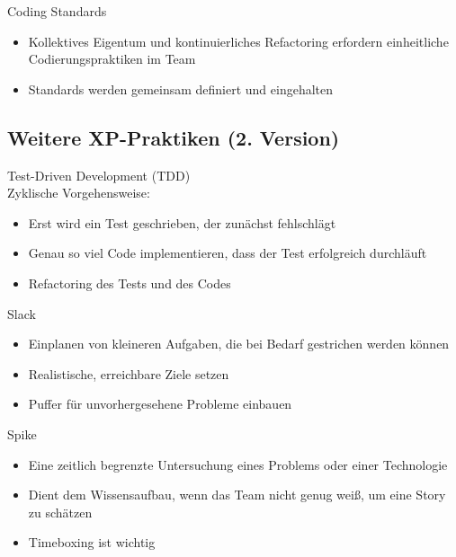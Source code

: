 \begin{concept}{Coding Standards}\\
    \begin{itemize}
        \item Kollektives Eigentum und kontinuierliches Refactoring erfordern einheitliche Codierungspraktiken im Team
        \item Standards werden gemeinsam definiert und eingehalten
    \end{itemize}
\end{concept}

\subsection{Weitere XP-Praktiken (2. Version)}

\begin{concept}{Test-Driven Development (TDD)}\\
    Zyklische Vorgehensweise:
    \begin{itemize}
        \item Erst wird ein Test geschrieben, der zunächst fehlschlägt
        \item Genau so viel Code implementieren, dass der Test erfolgreich durchläuft
        \item Refactoring des Tests und des Codes
    \end{itemize}
\end{concept}

\begin{concept}{Slack}\\
    \begin{itemize}
        \item Einplanen von kleineren Aufgaben, die bei Bedarf gestrichen werden können
        \item Realistische, erreichbare Ziele setzen
        \item Puffer für unvorhergesehene Probleme einbauen
    \end{itemize}
\end{concept}

\begin{concept}{Spike}\\
    \begin{itemize}
        \item Eine zeitlich begrenzte Untersuchung eines Problems oder einer Technologie
        \item Dient dem Wissensaufbau, wenn das Team nicht genug weiß, um eine Story zu schätzen
        \item Timeboxing ist wichtig
    \end{itemize}
\end{concept}

